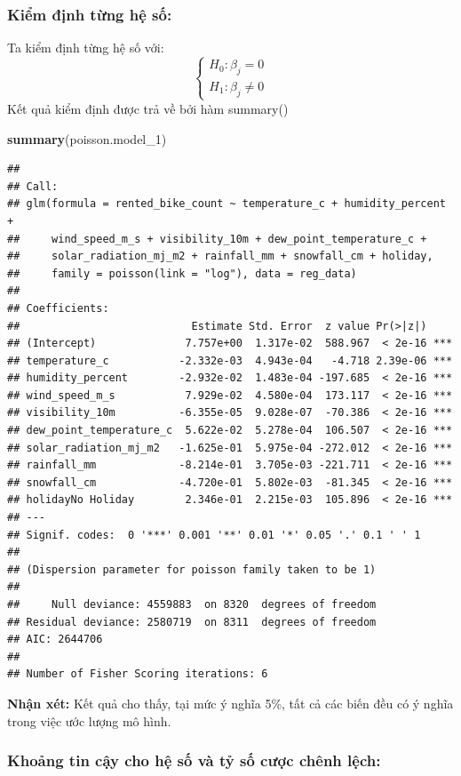 \documentclass[
  11pt,
  letterpaper,
]{article}
\newenvironment{Shaded}{\begin{snugshade}}{\end{snugshade}}
\newcommand{\FunctionTok}[1]{\textcolor[rgb]{0.13,0.29,0.53}{\textbf{#1}}}
\newcommand{\NormalTok}[1]{#1}
\begin{document}
\subsubsection{Kiểm định từng hệ số:}
Ta kiểm định từng hệ số với: 
$$\begin{cases}
H_0:    \beta_j = 0 \\
H_1:    \beta_j \neq 0
\end{cases}$$
Kết quả kiểm định được trả về bởi hàm summary()

\begin{Shaded}
\begin{Highlighting}[]
\FunctionTok{summary}\NormalTok{(poisson.model\_1)}
\end{Highlighting}
\end{Shaded}

\begin{verbatim}
## 
## Call:
## glm(formula = rented_bike_count ~ temperature_c + humidity_percent + 
##     wind_speed_m_s + visibility_10m + dew_point_temperature_c + 
##     solar_radiation_mj_m2 + rainfall_mm + snowfall_cm + holiday, 
##     family = poisson(link = "log"), data = reg_data)
## 
## Coefficients:
##                           Estimate Std. Error  z value Pr(>|z|)    
## (Intercept)              7.757e+00  1.317e-02  588.967  < 2e-16 ***
## temperature_c           -2.332e-03  4.943e-04   -4.718 2.39e-06 ***
## humidity_percent        -2.932e-02  1.483e-04 -197.685  < 2e-16 ***
## wind_speed_m_s           7.929e-02  4.580e-04  173.117  < 2e-16 ***
## visibility_10m          -6.355e-05  9.028e-07  -70.386  < 2e-16 ***
## dew_point_temperature_c  5.622e-02  5.278e-04  106.507  < 2e-16 ***
## solar_radiation_mj_m2   -1.625e-01  5.975e-04 -272.012  < 2e-16 ***
## rainfall_mm             -8.214e-01  3.705e-03 -221.711  < 2e-16 ***
## snowfall_cm             -4.720e-01  5.802e-03  -81.345  < 2e-16 ***
## holidayNo Holiday        2.346e-01  2.215e-03  105.896  < 2e-16 ***
## ---
## Signif. codes:  0 '***' 0.001 '**' 0.01 '*' 0.05 '.' 0.1 ' ' 1
## 
## (Dispersion parameter for poisson family taken to be 1)
## 
##     Null deviance: 4559883  on 8320  degrees of freedom
## Residual deviance: 2580719  on 8311  degrees of freedom
## AIC: 2644706
## 
## Number of Fisher Scoring iterations: 6
\end{verbatim}

\textbf{Nhận xét:} Kết quả cho thấy, tại mức ý nghĩa 5\%, tất cả các biến đều có ý nghĩa trong việc ước lượng mô hình.

\subsubsection{Khoảng tin cậy cho hệ số và tỷ số cược chênh lệch:}
\end{document}
